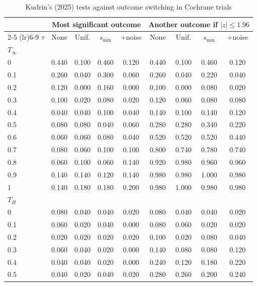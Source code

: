\begin{table}[htbp]
\centering
\caption{Kudrin's (2025) tests against outcome switching in Cochrane trials}
\label{tab:cochrane_switching_power_desktop_kudrin}
\footnotesize
\setlength{\tabcolsep}{4pt}
\begin{tabular}{lcccccccc}
\toprule
 & \multicolumn{4}{c}{Most significant outcome} & \multicolumn{4}{c}{Another outcome if $|z| \le 1.96$} \\
\cmidrule(lr){2-5} \cmidrule(lr){6-9}
$\tau$ & None & Unif. & $s_{\min}$ & $+$noise & None & Unif. & $s_{\min}$ & $+$noise \\
\midrule
\multicolumn{9}{l}{\textit{$T_\infty$}} \\
0 & 0.440 & 0.100 & 0.460 & 0.120 & 0.440 & 0.100 & 0.460 & 0.120 \\
0.1 & 0.260 & 0.040 & 0.300 & 0.060 & 0.260 & 0.040 & 0.220 & 0.040 \\
0.2 & 0.120 & 0.000 & 0.160 & 0.000 & 0.100 & 0.000 & 0.080 & 0.020 \\
0.3 & 0.100 & 0.020 & 0.080 & 0.020 & 0.120 & 0.060 & 0.080 & 0.080 \\
0.4 & 0.040 & 0.040 & 0.100 & 0.040 & 0.140 & 0.100 & 0.140 & 0.120 \\
0.5 & 0.080 & 0.080 & 0.040 & 0.060 & 0.280 & 0.280 & 0.340 & 0.220 \\
0.6 & 0.060 & 0.060 & 0.080 & 0.040 & 0.520 & 0.520 & 0.520 & 0.440 \\
0.7 & 0.080 & 0.060 & 0.100 & 0.100 & 0.800 & 0.740 & 0.780 & 0.740 \\
0.8 & 0.060 & 0.100 & 0.060 & 0.140 & 0.920 & 0.980 & 0.960 & 0.960 \\
0.9 & 0.140 & 0.140 & 0.120 & 0.140 & 0.980 & 0.980 & 1.000 & 0.980 \\
1 & 0.140 & 0.180 & 0.180 & 0.200 & 0.980 & 1.000 & 0.980 & 0.980 \\
\midrule
\multicolumn{9}{l}{\textit{$T_H$}} \\
0 & 0.080 & 0.040 & 0.040 & 0.020 & 0.080 & 0.040 & 0.040 & 0.020 \\
0.1 & 0.060 & 0.020 & 0.040 & 0.000 & 0.080 & 0.060 & 0.020 & 0.020 \\
0.2 & 0.020 & 0.020 & 0.020 & 0.020 & 0.100 & 0.020 & 0.080 & 0.040 \\
0.3 & 0.060 & 0.040 & 0.020 & 0.000 & 0.140 & 0.080 & 0.080 & 0.120 \\
0.4 & 0.040 & 0.040 & 0.020 & 0.000 & 0.240 & 0.120 & 0.180 & 0.220 \\
0.5 & 0.040 & 0.020 & 0.040 & 0.020 & 0.280 & 0.260 & 0.200 & 0.240 \\

\end{tabular}
\end{table}

